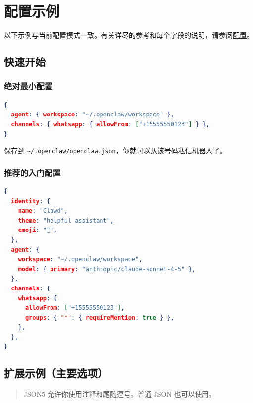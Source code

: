 \clearpage

\section{配置示例}


以下示例与当前配置模式一致。有关详尽的参考和每个字段的说明，请参阅\href{/gateway/configuration}{配置}。

\subsection{快速开始}


\subsubsection{绝对最小配置}


\begin{lstlisting}[language=json]
{
  agent: { workspace: "~/.openclaw/workspace" },
  channels: { whatsapp: { allowFrom: ["+15555550123"] } },
}
\end{lstlisting}


保存到 \texttt{\textasciitilde{}/.openclaw/openclaw.json}，你就可以从该号码私信机器人了。

\subsubsection{推荐的入门配置}


\begin{lstlisting}[language=json]
{
  identity: {
    name: "Clawd",
    theme: "helpful assistant",
    emoji: "🦞",
  },
  agent: {
    workspace: "~/.openclaw/workspace",
    model: { primary: "anthropic/claude-sonnet-4-5" },
  },
  channels: {
    whatsapp: {
      allowFrom: ["+15555550123"],
      groups: { "*": { requireMention: true } },
    },
  },
}
\end{lstlisting}


\subsection{扩展示例（主要选项）}


\begin{quote}
JSON5 允许你使用注释和尾随逗号。普通 JSON 也可以使用。
\end{quote}


